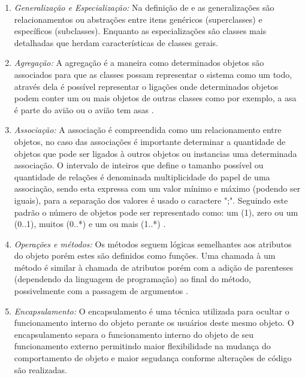 \begin{enumerate}
\item \textit{Generalização e Especialização:} Na definição de \cite{rumbaugh1991object} e \cite{booch2005unified} as generalizações são relacionamentos ou abstrações entre itens genéricos (superclasses) e específicos (subclasses). Enquanto as especializações são classes mais detalhadas que herdam características de classes gerais.

\item \textit{Agregação:} A agregação é a maneira como determinados objetos são associados para que as classes possam representar o sistema como um todo, através dela é possível representar o ligações onde determinados objetos podem conter um ou mais objetos de outras classes como por exemplo, a asa é parte do avião ou o avião tem asas \cite{rumbaugh1991object}.

\item \textit{Associação:} A associação é compreendida como um relacionamento entre objetos, no caso das associações é importante determinar a quantidade de objetos que pode ser ligados à outros objetos ou instancias uma determinada associação. O intervalo de inteiros que define o tamanho possível ou quantidade de relações é denominada multiplicidade do papel de uma associação, sendo esta expressa com um valor mínimo e máximo (podendo ser iguais), para a separação dos valores é usado o caractere ";". Seguindo este padrão o número de objetos pode ser representado como: um (1), zero ou um (0..1), muitos (0..*) e um ou mais (1..*) \cite{rumbaugh1991object}.


\item \textit{Operações e métodos:}
Os métodos seguem lógicas semelhantes aos atributos do objeto porém estes são definidos como funções. Uma chamada à um método é similar à chamada de atributos porém com a adição de parenteses (dependendo da linguagem de programação) ao final do método, possivelmente com a passagem de argumentos \cite{rumbaugh1991object}.


\item \textit{Encapsulamento:}
O encapsulamento é uma técnica utilizada para ocultar o funcionamento interno do objeto perante os usuários deste mesmo objeto. O encapsulamento separa o funcionamento interno do objeto de seu funcionamento externo permitindo maior flexibilidade na mudança do comportamento de objeto e maior segudança conforme alterações de código são realizadas\cite{rumbaugh1991object}.

\end{enumerate}



